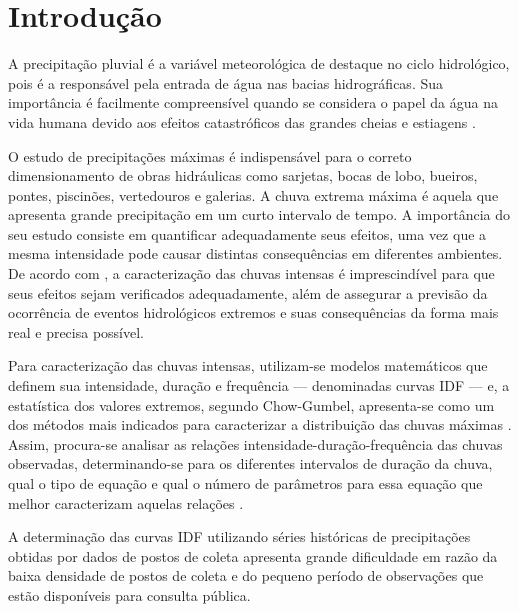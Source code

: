 \textual

\chapter*[Introdução]{Introdução}

A precipitação pluvial é a variável meteorológica de destaque no ciclo hidrológico, pois é a responsável pela entrada de água nas bacias hidrográficas. Sua importância é facilmente compreensível quando se considera o papel da água na vida humana devido aos efeitos catastróficos das grandes cheias e estiagens \cite{hidro-basica}.

O estudo de precipitações máximas é indispensável para o correto dimensionamento de obras hidráulicas como sarjetas, bocas de lobo, bueiros, pontes, piscinões, vertedouros e galerias. A chuva extrema máxima é aquela que apresenta grande precipitação em um curto intervalo de tempo. A importância do seu estudo consiste em quantificar adequadamente seus efeitos, uma vez que a mesma intensidade pode causar distintas consequências em diferentes ambientes.  De acordo com , a caracterização das chuvas intensas é imprescindível para que seus efeitos sejam verificados adequadamente, além de assegurar a previsão da ocorrência de eventos hidrológicos extremos e suas consequências da forma mais real e precisa possível.

Para caracterização das chuvas intensas, utilizam-se modelos matemáticos que definem sua intensidade, duração e frequência — denominadas curvas IDF — e, a estatística dos valores extremos, segundo Chow-Gumbel, apresenta-se como um dos métodos mais indicados para caracterizar a distribuição das chuvas máximas \cite{artigo-idf}. Assim, procura-se analisar as relações intensidade-duração-frequência das chuvas observadas, determinando-se para os diferentes intervalos de duração da chuva, qual o tipo de equação e qual o número de parâmetros para essa equação que melhor caracterizam aquelas relações \cite{hidro-aplicada}.

A determinação das curvas IDF utilizando séries históricas de precipitações obtidas por dados de postos de coleta apresenta grande dificuldade em razão da baixa densidade de postos de coleta e do pequeno período de observações que estão disponíveis para consulta pública. 


